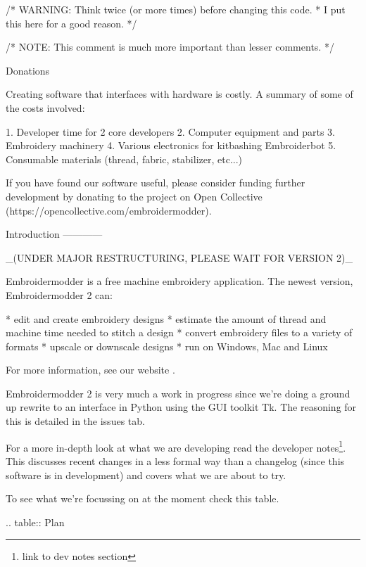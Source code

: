\documentclass[a4paper]{report}
\begin{document}
{    /* WARNING: Think twice (or more times) before changing this code.
     * I put this here for a good reason. */

    /* NOTE: This comment is much more important than lesser comments. */

Donations
~~~~~~~~~

Creating software that interfaces with hardware is costly. A summary
of some of the costs involved:

1. Developer time for 2 core developers
2. Computer equipment and parts
3. Embroidery machinery
4. Various electronics for kitbashing Embroiderbot
5. Consumable materials (thread, fabric, stabilizer, etc...)

If you have found our software useful, please consider funding further
development by donating to the project on Open Collective
(https://opencollective.com/embroidermodder).

Introduction
------------

_(UNDER MAJOR RESTRUCTURING, PLEASE WAIT FOR VERSION 2)_

Embroidermodder is a free machine embroidery application.
The newest version, Embroidermodder 2 can:

* edit and create embroidery designs
* estimate the amount of thread and machine time needed to stitch a design
* convert embroidery files to a variety of formats
* upscale or downscale designs
* run on Windows, Mac and Linux

For more information, see our website \cite{thewebsite}.

Embroidermodder 2 is very much a work in progress since we're doing a ground up rewrite to an interface in Python using the GUI toolkit Tk. The reasoning for this is detailed in the issues tab.

For a more in-depth look at what we are developing read the developer notes\footnote{link to dev notes section}. This discusses recent changes in a less formal way than a changelog (since this software is in development) and covers what we are about to try.

To see what we're focussing on at the moment check this table.

.. table:: Plan

}
\end{document}
